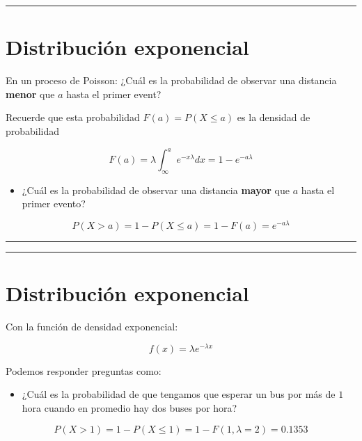\documentclass[
]{book}
\providecommand{\tightlist}{%
  \setlength{\itemsep}{0pt}\setlength{\parskip}{0pt}}
\begin{document}
\begin{center}\rule{0.5\linewidth}{0.5pt}\end{center}

\hypertarget{distribuciuxf3n-exponencial}{%
\section{Distribución exponencial}\label{distribuciuxf3n-exponencial}}

En un proceso de Poisson: ¿Cuál es la probabilidad de observar una distancia \textbf{menor} que \(a\) hasta el primer event?

Recuerde que esta probabilidad \(F(a)=P(X \leq a)\) es la densidad de probabilidad

\[F(a)=\lambda\int_\infty^a e^{-x\lambda}dx=1-e^{-a\lambda}\]

\begin{itemize}
\tightlist
\item
  ¿Cuál es la probabilidad de observar una distancia \textbf{mayor} que \(a\) hasta el primer evento?
\end{itemize}

\[P(X > a)=1- P(X \leq a)= 1- F(a) = e^{-a\lambda}\]

\begin{center}\rule{0.5\linewidth}{0.5pt}\end{center}

\begin{center}\rule{0.5\linewidth}{0.5pt}\end{center}

\hypertarget{distribuciuxf3n-exponencial-1}{%
\section{Distribución exponencial}\label{distribuciuxf3n-exponencial-1}}

Con la función de densidad exponencial:

\[f(x)=\lambda e^{-\lambda x}\]

Podemos responder preguntas como:

\begin{itemize}
\tightlist
\item
  ¿Cuál es la probabilidad de que tengamos que esperar un bus por más de \(1\) hora cuando en promedio hay dos buses por hora?
\end{itemize}

\[P(X > 1)=1-P(X \le 1) = 1-F(1,\lambda=2)=0.1353\]
\end{document}
